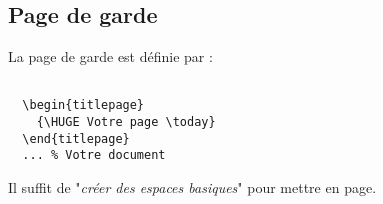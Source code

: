         \subsection{Page de garde}
            La page de garde est définie par :
            \begin{lstlisting}

  \begin{titlepage}
    {\HUGE Votre page \today}
  \end{titlepage}
  ... % Votre document

            \end{lstlisting}
            Il suffit de "\textit{créer des espaces basiques}" pour mettre en page.



